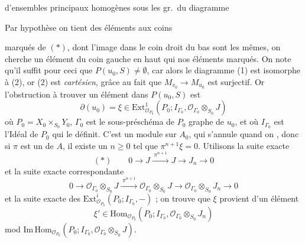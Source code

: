 \documentclass[11pt,a4paper]{article}
\begin{document}
d'ensembles principaux homogènes sous les gr.\ du diagramme


Par hypothèse on tient des éléments aux coins


marqués de $(\ast)$, dont l'image dans le coin droit du bas sont les mêmes, on cherche un élément du coin gauche en haut qui  nos éléments marqués. On note qu'il suffit pour ceci que $P(u_0,S)\neq\emptyset$, car alors le diagramme (1) est isomorphe à (2), or (2) est \emph{cartésien}, grâce au fait que $M_{v_0}\to M_{u_0}$ est surjectif. Or l'obstruction à trouver un élément dans $P(u_0,S)$ est \struck{\ill{}}
\[
\partial(u_0)=\xi\in\mathrm{Ext}^1_{\mathcal{O}_{P_0}}(P_0;I_{\Gamma_0},\mathcal{O}_{\Gamma_0}\otimes_{S_0}J)
\]
où $P_0=X_0\times_{S_0}Y_0$, \struck{\ill{}} $\Gamma_0$ est le sous-préschéma de $P_0$ graphe de $u_0$, et où $I_{\Gamma_0}$ est l'Idéal de $P_0$ qui le définit. C'est un module sur $A_0$, qui s'annule quand on \struck{\ill{}} , donc si $\pi$ est un  de $A$, il existe un $n\geqslant 0$ tel que $\pi^{n+1}\xi=0$. Utilisons la suite exacte
\[
(\ast)\qquad 0\to J\xrightarrow{\;\pi^{n+1}\;}J\to J_n\to 0
\]
et la suite exacte correspondante
\[
0\to\mathcal{O}_{\Gamma_0}\otimes_{S_0}J\xrightarrow{\;\pi^{n+1}\;}\mathcal{O}_{\Gamma_0}\otimes_{S_0}J\to\mathcal{O}_{\Gamma_0}\otimes_{S_0}J_n\to 0
\]
et la suite exacte des $\mathrm{Ext}^i_{\mathcal{O}_{P_0}}(P_0;I_{\Gamma_0},-)$ ; on trouve que $\xi$ provient d'un élément
\[
\xi'\in\mathrm{Hom}_{\mathcal{O}_{P_0}}(P_0;I_{\Gamma_0},\mathcal{O}_{\Gamma_0}\otimes_{S_0}J_n)
\]
mod $\mathrm{Im}\,\mathrm{Hom}_{\mathcal{O}_{P_0}}(P_0;I_{\Gamma_0},\mathcal{O}_{\Gamma_0}\otimes_{S_0}J)$.
\end{document}
